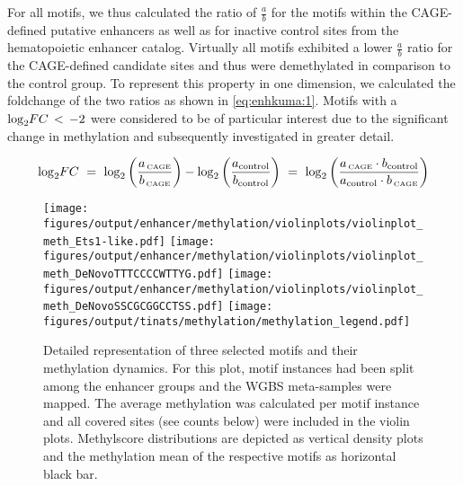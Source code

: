 For all motifs, we thus calculated the ratio of $\frac{a}{b}$ for the motifs within the CAGE-defined putative enhancers as well as for inactive control sites from the hematopoietic enhancer catalog\cite{Lara-Astiaso2014}. Virtually all motifs exhibited a lower $\frac{a}{b}$ ratio for the CAGE-defined candidate sites and thus were demethylated in comparison to the control group. To represent this property in one dimension, we calculated the foldchange of the two ratios as shown in \autoref{eq:enhkuma:1}. Motifs with a $\log_2\hspace{-0.2em}FC\,<\,-2$ were considered to be of particular interest due to the significant change in methylation  and subsequently investigated in greater detail. 

\begin{eqnarray}
\label{eq:enhkuma:1} \log_2\hspace{-0.2em}FC \ = \ \log_2 \left( \frac{a_{\text{\,\tiny CAGE}}}{ b_{\text{\,\tiny CAGE}} } \right) - \log_2 \left( \frac{a_{\text{control}} }{ b_{\text{control}} } \right) \ = \ \log_2 \left( \frac{a_{\text{\,\tiny CAGE}} \cdot b_{\text{control}} }{ a_{\text{control}} \cdot b_{\text{\,\tiny CAGE}} } \right) 
\end{eqnarray}

\begin{figure}[!htb]
	\centering
	\texttt{[image: figures/output/enhancer/methylation/violinplots/violinplot\_meth\_Ets1-like.pdf]} \texttt{[image: figures/output/enhancer/methylation/violinplots/violinplot\_meth\_DeNovoTTTCCCCWTTYG.pdf]}
	\texttt{[image: figures/output/enhancer/methylation/violinplots/violinplot\_meth\_DeNovoSSCGCGGCCTSS.pdf]} 
	\texttt{[image: figures/output/tinats/methylation/methylation\_legend.pdf]} 
	\caption{Detailed representation of three selected motifs and their methylation dynamics. For this plot, motif instances had been split among the enhancer groups and the WGBS meta-samples were mapped. The average methylation was calculated per motif instance and all covered sites (see counts below) were included in the violin plots. Methylscore distributions are depicted as vertical density plots and the methylation mean of the respective motifs as horizontal black bar.}
	\label{fig:enhancers:motifs:violinplot_meth_motifs}
\end{figure}

